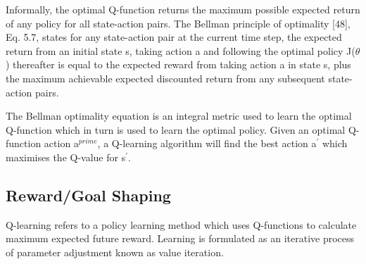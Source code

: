 \documentclass[runningheads]{llncs}
\begin{document}
Informally, the optimal Q-function returns the maximum possible expected return
of any policy for all state-action pairs. The Bellman principle of optimality [48], Eq. 5.7,
states for any state-action pair at the current time step, the expected return from an initial
state s, taking action a and following the optimal policy J($\theta$) thereafter is equal to the
expected reward from taking action a in state s, plus the maximum achievable expected
discounted return from any subsequent state-action pairs.

The Bellman optimality equation is an integral metric used to learn the optimal Q-function
which in turn is used to learn the optimal policy. Given an optimal Q-function action a$^{prime}$, a
Q-learning algorithm will find the best action a$^{\prime}$ which maximises the Q-value for s$^{\prime}$.


\subsection{Reward/Goal Shaping}
Q-learning refers to a policy learning method which uses Q-functions to calculate maximum
expected future reward. Learning is formulated as an iterative process of parameter
adjustment known as value iteration.
\end{document}
